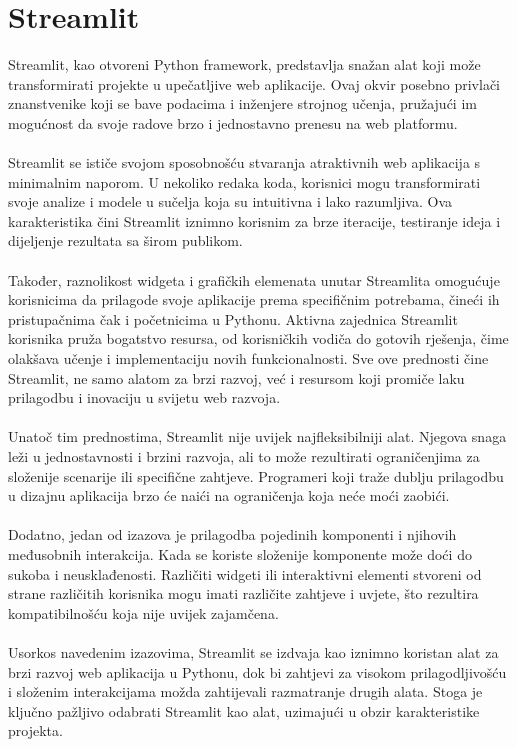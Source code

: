	\section{Streamlit}

	Streamlit, kao otvoreni Python framework, predstavlja snažan alat koji može transformirati projekte u upečatljive web aplikacije. Ovaj okvir posebno privlači znanstvenike koji se bave podacima i inženjere strojnog učenja, pružajući im mogućnost da svoje radove brzo i jednostavno prenesu na web platformu.
	\\ \\
	Streamlit se ističe svojom sposobnošću stvaranja atraktivnih web aplikacija s minimalnim naporom. U nekoliko redaka koda, korisnici mogu transformirati svoje analize i modele u sučelja koja su intuitivna i lako razumljiva. Ova karakteristika čini Streamlit iznimno korisnim za brze iteracije, testiranje ideja i dijeljenje rezultata sa širom publikom.
	\\ \\
	Također, raznolikost widgeta i grafičkih elemenata unutar Streamlita omogućuje korisnicima da prilagode svoje aplikacije prema specifičnim potrebama, čineći ih pristupačnima čak i početnicima u Pythonu. Aktivna zajednica Streamlit korisnika pruža bogatstvo resursa, od korisničkih vodiča do gotovih rješenja, čime olakšava učenje i implementaciju novih funkcionalnosti. Sve ove prednosti čine Streamlit, ne samo alatom za brzi razvoj, već i resursom koji promiče laku prilagodbu i inovaciju u svijetu web razvoja.
	\\ \\
	Unatoč tim prednostima, Streamlit nije uvijek najfleksibilniji alat. Njegova snaga leži u jednostavnosti i brzini razvoja, ali to može rezultirati ograničenjima za složenije scenarije ili specifične zahtjeve. Programeri koji traže dublju prilagodbu u dizajnu aplikacija brzo će naići na ograničenja koja neće moći zaobići.
	\\ \\
	Dodatno, jedan od izazova je prilagodba pojedinih komponenti i njihovih međusobnih interakcija. Kada se koriste složenije komponente može doći do sukoba i neusklađenosti. Različiti widgeti ili interaktivni elementi stvoreni od strane različitih korisnika mogu imati različite zahtjeve i uvjete, što rezultira kompatibilnošću koja nije uvijek zajamčena.
	\\ \\
	Usorkos navedenim izazovima, Streamlit se izdvaja kao iznimno koristan alat za brzi razvoj web aplikacija u Pythonu, dok bi zahtjevi za visokom prilagodljivošću i složenim interakcijama možda zahtijevali razmatranje drugih alata. Stoga je ključno pažljivo odabrati Streamlit kao alat, uzimajući u obzir karakteristike projekta.

